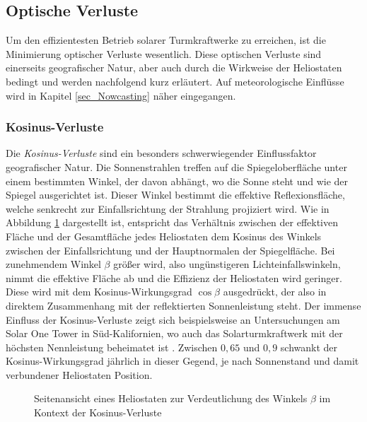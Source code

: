 \subsection{Optische Verluste} \label{subsec_OptischeVerluste}
Um den effizientesten Betrieb solarer Turmkraftwerke zu erreichen, ist die Minimierung optischer Verluste wesentlich.
Diese optischen Verluste sind einerseits geografischer Natur, aber auch durch die Wirkweise der Heliostaten bedingt und werden nachfolgend kurz erläutert.
Auf meteorologische Einflüsse wird in Kapitel \ref{sec_Nowcasting} näher eingegangen.

\subsubsection*{Kosinus-Verluste} \label{subsubsec_KosinusVerluste}
Die \textit{Kosinus-Verluste} sind ein besonders schwerwiegender Einflussfaktor geografischer Natur.
Die Sonnenstrahlen treffen auf die Spiegeloberfläche unter einem bestimmten Winkel, der davon abhängt, wo die Sonne steht und wie der Spiegel ausgerichtet ist.
Dieser Winkel bestimmt die effektive Reflexionsfläche, welche senkrecht zur Einfallsrichtung der Strahlung projiziert wird.
Wie in Abbildung \ref{fig_KosinusVerlust} dargestellt ist, entspricht das Verhältnis zwischen der effektiven Fläche und der Gesamtfläche jedes Heliostaten dem Kosinus des Winkels zwischen der Einfallsrichtung und der Hauptnormalen der Spiegelfläche.
Bei zunehmendem Winkel $\beta$ größer wird, also ungünstigeren Lichteinfallswinkeln, nimmt die effektive Fläche ab und die Effizienz der Heliostaten wird geringer.
Diese wird mit dem Kosinus-Wirkungsgrad $\cos\beta$ ausgedrückt, der also in direktem Zusammenhang mit der reflektierten Sonnenleistung steht.
Der immense Einfluss der Kosinus-Verluste zeigt sich beispielsweise an Untersuchungen am Solar One Tower in Süd-Kalifornien, wo auch das Solarturmkraftwerk mit der höchsten Nennleistung beheimatet ist \cite{Ivanpah}.
Zwischen $0,65$ und $0,9$ schwankt der Kosinus-Wirkungsgrad jährlich in dieser Gegend, je nach Sonnenstand und damit verbundener Heliostaten Position. \cite{Holl}

\begin{figure}[h!]
    \centering
    \setlength{\fboxsep}{1pt}
    \setlength{\fboxrule}{1pt}
\caption[Seitenansicht eines Heliostaten zur Verdeutlichung des Winkels $\beta$ im Kontext der Kosinus-Verluste]{Seitenansicht eines Heliostaten zur Verdeutlichung des Winkels $\beta$ im Kontext der Kosinus-Verluste \cite[S.7]{DissZanger}}
    \label{fig_KosinusVerlust}
\end{figure}

